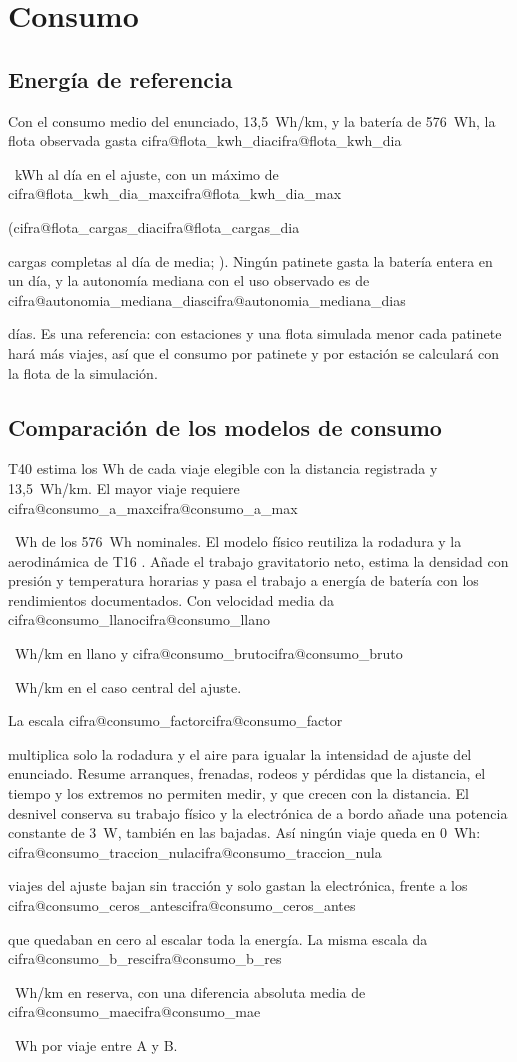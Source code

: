 \documentclass[11pt,a4paper]{article}
\makeatletter
\newcommand\cifra[1]{\ifcsname cifra@#1\endcsname\csname cifra@#1\endcsname
  \else\PackageError{memoria}{Cifra desconocida: \detokenize{#1}}{Revisa generar_cifras.py}\fi}
\makeatother
\begin{document}
\section{Consumo}

\subsection{Energía de referencia}
Con el consumo medio del enunciado, 13,5~Wh/km, y la batería de 576~Wh, la flota observada
gasta \cifra{flota_kwh_dia}~kWh al día en el ajuste, con un máximo de
\cifra{flota_kwh_dia_max} (\cifra{flota_cargas_dia} cargas completas al día de media;
). Ningún patinete gasta la batería entera en un
día, y la autonomía mediana con el uso observado es de \cifra{autonomia_mediana_dias} días.
Es una referencia: con estaciones y una flota simulada menor cada patinete hará más viajes,
así que el consumo por patinete y por estación se calculará con la flota de la simulación.

\subsection{Comparación de los modelos de consumo}
T40 estima los Wh de cada viaje elegible con la distancia registrada y
13,5~Wh/km. El mayor viaje requiere \cifra{consumo_a_max}~Wh de los 576~Wh
nominales. El modelo físico reutiliza la rodadura y la aerodinámica de T16
\cite{fisica_scooter}. Añade el trabajo gravitatorio neto, estima la densidad
con presión y temperatura horarias \cite{openmeteo} y pasa el trabajo a
energía de batería con los rendimientos documentados. Con velocidad media
da \cifra{consumo_llano}~Wh/km en llano y \cifra{consumo_bruto}~Wh/km en el
caso central del ajuste.

La escala \cifra{consumo_factor} multiplica solo la rodadura y el aire para
igualar la intensidad de ajuste del enunciado. Resume arranques, frenadas,
rodeos y pérdidas que la distancia, el tiempo y los extremos no permiten
medir, y que crecen con la distancia. El desnivel conserva su trabajo físico
y la electrónica de a bordo añade una potencia constante de 3~W, también en
las bajadas. Así ningún viaje queda en 0~Wh: \cifra{consumo_traccion_nula}
viajes del ajuste bajan sin tracción y solo gastan la electrónica, frente a
los \cifra{consumo_ceros_antes} que quedaban en cero al escalar toda la
energía. La misma escala da \cifra{consumo_b_res}~Wh/km en reserva, con una
diferencia absoluta media de \cifra{consumo_mae}~Wh por viaje entre A y B.
\end{document}
